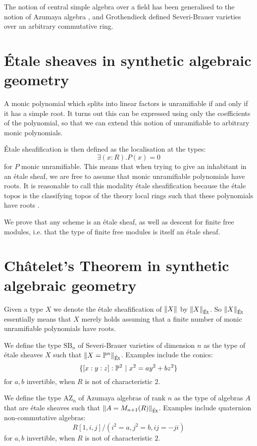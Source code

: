 \documentclass{../util/zariski}
\newcommand{\SB}{\mathrm{SB}}
\newcommand{\AZ}{\mathrm{AZ}}
\newcommand{\propTruncEt}[1]{\propTrunc{#1}_{\mathrm{\acute{E}t}}}
\begin{document}
The notion of central simple algebra over a field
has been generalised to the notion of Azumaya algebra  \cite{azumaya51}, and
Grothendieck \cite{grothendieck68} defined Severi-Brauer varieties over an arbitrary commutative ring.


\section{Étale sheaves in synthetic algebraic geometry}

A monic polynomial which splits into linear factors is unramifiable if and only if it has a simple root. It turns out this can be expressed using only the coefficients of the polynomial, so that we can extend this notion of unramifiable to arbitrary monic polynomials.

Étale sheafification is then defined as the localisation \cite{modalities} at the types: 
\[\exists (x:R).P(x)=0\] 
for $P$ monic unramifiable. This means that when trying to give an inhabitant in an étale sheaf, we are free to assume that monic unramifiable polynomials have roots. It is reasonable to call this modality étale sheafification because the étale topos is the classifying topos of the theory local rings such that these polynomials have roots \cite{wraith79}.

We prove that any scheme is an étale sheaf, as well as descent for finite free modules, i.e. that the type of finite free modules is itself an étale sheaf.


\section{Ch\^atelet's Theorem in synthetic algebraic geometry}

Given a type $X$ we denote the étale sheafification of $\lVert X \rVert$ by $\propTruncEt{X}$. So $\propTruncEt{X}$ essentially means that $X$ merely holds assuming that a finite number of monic unramifiable polynomials have roots.

We define the type $\SB_n$ of Severi-Brauer varieties of dimension $n$ as the type of étale sheaves $X$ such that $\lVert X=\mathbb{P}^n \rVert_{\mathrm{\acute{E}t}}$. Examples include the conics:
\[\{[x:y:z]:\mathbb{P}^2\ |\ x^2 = ay^2+bz^2\}\]
for $a,b$ invertible, when $R$ is not of characteristic $2$.

We define the type $\AZ_n$ of Azumaya algebras of rank $n$ as the type of algebras $A$ that are étale sheaves such that $\lVert A=M_{n+1}(R) \rVert_{\mathrm{\acute{E}t}}$. Examples include quaternion non-commutative algebras: 
\[R[1,i,j]/(i^2=a,j^2=b,ij=-ji)\]
for $a,b$ invertible, when $R$ is not of characteristic $2$.
\end{document}
